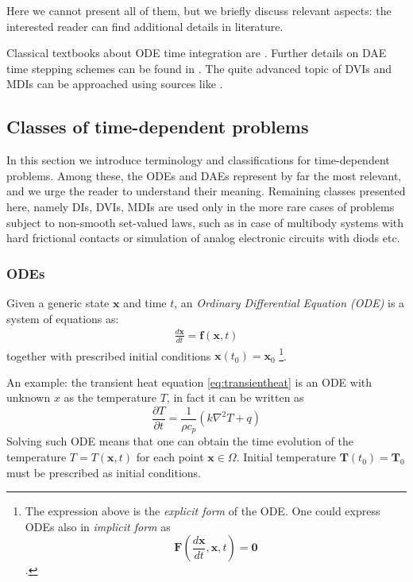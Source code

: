 \documentclass{digitaldynamics}
\def\vect#1{\bm{#1}}
\begin{document}
Here we cannot present all of them, but we briefly 
discuss relevant aspects: the interested reader can find additional details in literature.

Classical textbooks about ODE time integration are \cite{hawa93,hawa96}. Further details on DAE time stepping schemes can be found in \cite{aspe98}.
The quite advanced topic of DVIs and MDIs can be approached using sources like \cite{pastew03dvi,pfeifferGlocker1996,acary2008numerical}.


\subsection{Classes of time-dependent problems}


In this section we introduce terminology and classifications for time-dependent problems.
Among these, the ODEs and DAEs represent by far the most relevant, and we urge the reader to 
understand their meaning. Remaining classes presented here, namely DIs, DVIs, MDIs are used
only in the more rare cases of problems subject to non-smooth set-valued laws, such as in
case of multibody systems with hard frictional contacts or simulation of analog electronic 
circuits with diods etc.


\subsubsection{ODEs}

Given a generic state $\vect{x}$ and time $t$, an \textit{Ordinary Differential Equation (ODE)} is a system of equations as:
%
\begin{align}
  \frac{d\vect{\vect{x}}}{dt}  = \vect{f} \left( \vect{x}, t\right)
\end{align}
%
together with prescribed initial conditions $\vect{x}(t_0)=\vect{x}_0$ 
\footnote{The expression above is the \textit{explicit form} of the ODE. One could express ODEs also in \textit{implicit form} as 
\[
\vect{F} \left( \frac{d\vect{\vect{x}}}{dt}, \vect{x}, t\right) = \vect{0}
\].
}.

An example: the transient heat equation \eqref{eq:transientheat} is an ODE with unknown $x$ as the temperature $T$, 
in fact it can be written as 
\[
\frac{\partial T}{\partial t} = \frac{1}{\rho c_p}\left(k\nabla^2 T + q\right)
\]
Solving such ODE means that one can obtain the time evolution of the temperature $T=T(\vect{x},t)$ for each point $\vect{x} \in \Omega$. Initial temperature
$\vect{T}(t_0)=\vect{T}_0$ must be prescribed as initial conditions.
\end{document}
